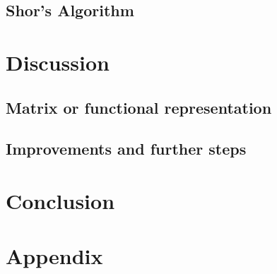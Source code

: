 \documentclass[bibliography=totocnumbered]{article}
\theoremstyle{NoticeStyle}
\begin{document}
\subsection{Shor's Algorithm}


%
\section{Discussion}

\subsection{Matrix or functional representation}

\subsection{Improvements and further steps}

%
\section{Conclusion}


%
\section{Appendix}
%

\newpage

{}

\nocite{Perry2012}
\nocite{BasicConceptsQC}



\end{document}
